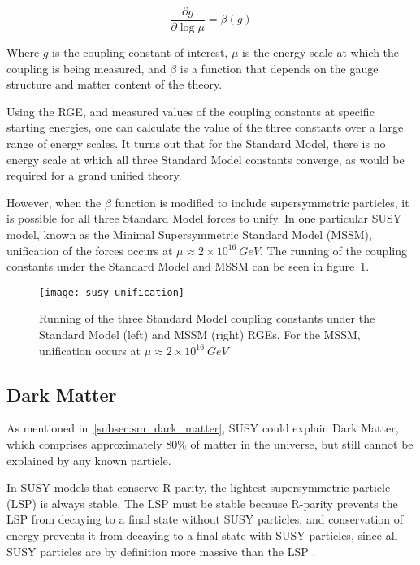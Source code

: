 \begin{equation}\label{eq:renorm_group}
    \frac{\partial g}{\partial \log \mu} = \beta(g)
\end{equation}

Where $g$ is the coupling constant of interest, $\mu$ is the energy scale at which the coupling is being measured,
and $\beta$ is a function that depends on the gauge structure and matter content of the theory.

Using the RGE, and measured values of the coupling constants at specific starting energies,
one can calculate the value of the three constants over a large range of energy scales.
It turns out that for the Standard Model, there is no energy scale at which all three Standard Model constants converge,
as would be required for a grand unified theory.

However, when the $\beta$ function is modified to include supersymmetric particles,
it is possible for all three Standard Model forces to unify.
In one particular SUSY model, known as the Minimal Supersymmetric Standard Model (MSSM),
unification of the forces occurs at $\mu \approx 2\times10^{16}~GeV$.\cite{susy-unification-1998}
The running of the coupling constants under the Standard Model and MSSM can be seen in figure~\ref{fig:susy_unification}.

\begin{figure}[h!]
    \centering
\texttt{[image: susy\_unification]}
\caption{Running of the three Standard Model coupling constants under the Standard Model (left) and MSSM (right) RGEs.
For the MSSM, unification occurs at $\mu\approx 2\times 10^{16}~GeV$}
\label{fig:susy_unification}
\end{figure}\cite{susy-pheno-2000}

\subsection{Dark Matter}\label{subsec:susy_dark_matter}

As mentioned in~\ref{subsec:sm_dark_matter}, SUSY could explain Dark Matter,
which comprises approximately $80\%$ of matter in the universe, but still cannot be explained by any known particle.

In SUSY models that conserve R-parity, the lightest supersymmetric particle (LSP) is always stable.
The LSP must be stable because R-parity prevents the LSP from decaying to a final state without SUSY particles,
and conservation of energy prevents it from decaying to a final state with SUSY particles,
since all SUSY particles are by definition more massive than the LSP .

